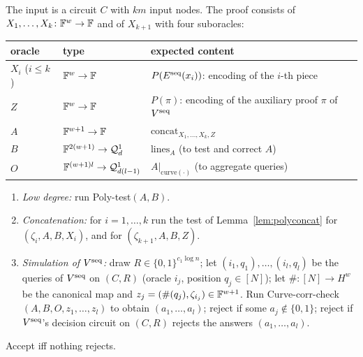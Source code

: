\begin{definition}\label{def:vpar}
The input is a circuit $C$ with $km$ input nodes.  The proof consists of $X_1,\dots,X_k\colon\mathbb{F}^w\to\mathbb{F}$ and of $X_{k+1}$ with four suboracles:
\begin{center}\small
\renewcommand{\arraystretch}{1.2}
\begin{tabular}{@{}lll@{}}
\toprule
oracle & type & expected content\\
\midrule
$X_i$ ($i\le k$) & $\mathbb{F}^w\to\mathbb{F}$ & $P(E^{\rm seq}(x_i))$: encoding of the $i$-th piece\\
$Z$ & $\mathbb{F}^w\to\mathbb{F}$ & $P(\pi)$: encoding of the auxiliary proof $\pi$ of $V^{\rm seq}$\\
$A$ & $\mathbb{F}^{w+1}\to\mathbb{F}$ & $\mathrm{concat}_{X_1,\dots,X_k,Z}$\\
$B$ & $\mathbb{F}^{2(w+1)}\to\mathcal Q^1_d$ & $\mathrm{lines}_A$ (to test and correct $A$)\\
$O$ & $\mathbb{F}^{(w+1)l}\to\mathcal Q^1_{d(l-1)}$ & $A|_{\mathrm{curve}(\cdot)}$ (to aggregate queries)\\
\bottomrule
\end{tabular}
\end{center}
\begin{enumerate}
  \item \emph{Low degree:} run Poly-test$(A,B)$.
  \item \emph{Concatenation:} for $i=1,\dots,k$ run the test of Lemma~\ref{lem:polyconcat} for $(\zeta_i,A,B,X_i)$, and for $(\zeta_{k+1},A,B,Z)$.
  \item \emph{Simulation of $V^{\rm seq}$:} draw $R\in\{0,1\}^{c_1\log n}$; let $(i_1,q_1),\dots,(i_l,q_l)$ be the queries of $V^{\rm seq}$ on $(C,R)$ (oracle $i_j$, position $q_j\in[N]$); let $\#\colon[N]\to H^w$ be the canonical map and $z_j=(\#(q_j),\zeta_{i_j})\in\mathbb{F}^{w+1}$.
        Run Curve-corr-check$(A,B,O,z_1,\dots,z_l)$ to obtain $(a_1,\dots,a_l)$; reject if some $a_j\notin\{0,1\}$; reject if $V^{\rm seq}$'s decision circuit on $(C,R)$ rejects the answers $(a_1,\dots,a_l)$.
\end{enumerate}
Accept iff nothing rejects.
\end{definition}

